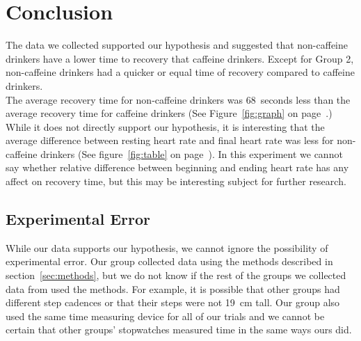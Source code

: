 \documentclass{article}
\begin{document}
\section{Conclusion}
The data we collected supported our hypothesis and suggested that non-caffeine drinkers have a lower
time to recovery that caffeine drinkers. Except for Group 2, non-caffeine drinkers had a quicker or
equal time of recovery compared to caffeine drinkers. \\

The average recovery time for non-caffeine drinkers was \SI{68}{seconds} less than the
average recovery time for caffeine drinkers (See Figure~\ref{fig:graph} on page~\pageref{fig:graph}.) \\

While it does not directly support our hypothesis, it is interesting that the average difference
between resting heart rate and final heart rate was less for non-caffeine drinkers (See
figure~\ref{fig:table} on page~\pageref{fig:table}).
In this experiment we cannot say whether relative difference between beginning and ending heart rate
has any affect on recovery time, but this may be interesting subject for further research. \\

\subsection{Experimental Error}
While our data supports our hypothesis, we cannot ignore the possibility of experimental error.
Our group collected data using the methods described in section~\ref{sec:methods}, but we do not
know if the rest of the groups we collected data from used the methods. For example, it is possible
that other groups had different step cadences or that their steps were not \SI{19}{cm} tall.
Our group also used the same time measuring device for all of our trials and we cannot be certain that
other groups' stopwatches measured time in the same ways ours did.

%
\end{document}
